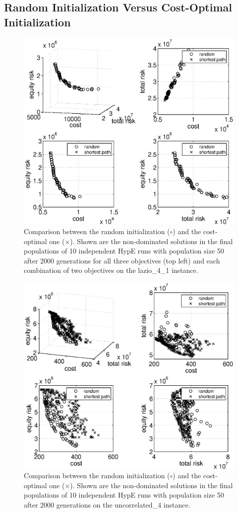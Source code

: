 \documentclass[preprint,12pt]{elsarticle}
\begin{document}
\subsection{Random Initialization Versus Cost-Optimal Initialization}

\begin{figure}
	\centering
	\includegraphics[width=0.75\columnwidth]{../experiments/randVsCost/randVsCost_ns4_1_OriginalCost_2000gens.eps}
	\vspace{-1em}
	\caption{\label{fig:allsolutions} Comparison between the random initialization ($\circ$) and the cost-optimal one ($\times$). Shown are the non-dominated solutions in the final populations of 10 independent HypE runs with population size 50 after 2000 generations for all three objectives (top left) and each combination of two objectives on the lazio\_4\_1 instance.}
\end{figure}

\begin{figure}
	\centering
	\includegraphics[width=0.75\columnwidth]{../experiments/randVsCost/randVsCost_ns4_1_New_2000gens.eps}
	\vspace{-1em}
	\caption{\label{fig:onlynondominated} Comparison between the random initialization ($\circ$) and the cost-optimal one ($\times$). Shown are the non-dominated solutions in the final populations of 10 independent HypE runs with population size 50 after 2000 generations on the uncorrelated\_4 instance.}
\end{figure}
\end{document}
